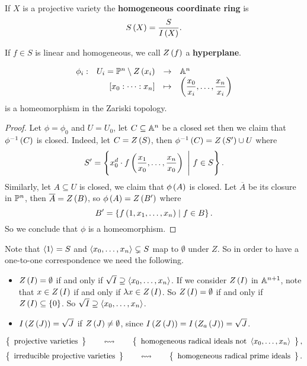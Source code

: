 \begin{definition}
If $ X $ is a projective variety the \textbf{homogeneous coordinate ring} is
$$ S\rb{X} = \dfrac{S}{I\rb{X}}. $$
\end{definition}

\begin{definition}
If $ f \in S $ is linear and homogeneous, we call $ Z\rb{f} $ a \textbf{hyperplane}.
\end{definition}


\begin{proposition}
$$ \function[\phi_i]{U_i = \P^n \setminus Z\rb{x_i}}{\A^n}{\sb{x_0 : \dots : x_n}}{\rb{\dfrac{x_0}{x_i}, \dots, \dfrac{x_n}{x_i}}} $$
is a homeomorphism in the Zariski topology.
\end{proposition}

\begin{proof}
Let $ \phi = \phi_0 $ and $ U = U_0 $, let $ C \subseteq \A^n $ be a closed set then we claim that $ \phi^{-1}\rb{C} $ is closed. Indeed, let $ C = Z\rb{S} $, then $ \phi^{-1}\rb{C} = Z\rb{S'} \cup U $ where
$$ S' = \cb{x_0^d \cdot f\rb{\dfrac{x_1}{x_0}, \dots, \dfrac{x_n}{x_0}} \ \Bigg| \ f \in S}. $$
Similarly, let $ A \subseteq U $ is closed, we claim that $ \phi\rb{A} $ is closed. Let $ \overline{A} $ be its closure in $ \P^n $, then $ \overline{A} = Z\rb{B} $, so $ \phi\rb{A} = Z\rb{B'} $ where
$$ B' = \cb{f\rb{1, x_1, \dots, x_n} \mid f \in B}. $$
So we conclude that $ \phi $ is a homeomorphism.
\end{proof}

Note that $ \ab{1} = S $ and $ \ab{x_0, \dots, x_n} \subsetneq S $ map to $ \emptyset $ under $ Z $. So in order to have a one-to-one correspondence we need the following.
\begin{itemize}
\item $ Z\rb{I} = \emptyset $ if and only if $ \sqrt{I} \supseteq \ab{x_0, \dots, x_n} $. If we consider $ Z\rb{I} $ in $ \A^{n + 1} $, note that $ x \in Z\rb{I} $ if and only if $ \lambda x \in Z\rb{I} $. So $ Z\rb{I} = \emptyset $ if and only if $ Z\rb{I} \subseteq \cb{0} $. So $ \sqrt{I} \supseteq \ab{x_0, \dots, x_n} $.
\item $ I\rb{Z\rb{J}} = \sqrt{J} $ if $ Z\rb{J} \ne \emptyset $, since $ I\rb{Z\rb{J}} = I\rb{Z_a\rb{J}} = \sqrt{J} $.
\end{itemize}

\begin{corollary}
$$ \correspondence{\text{projective varieties}}{\text{homogeneous radical ideals not} \ \ab{x_0, \dots, x_n}}, $$
$$ \correspondence{\text{irreducible projective varieties}}{\text{homogeneous radical prime ideals}}. $$
\end{corollary}

